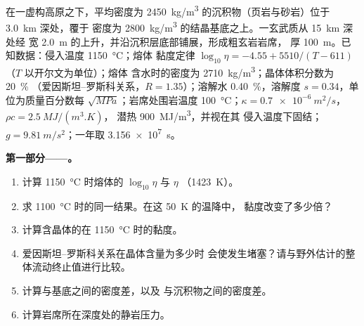 \begin{problem}
\label{pb:b2:magma-emplacement:1}
在一虚构高原之下，平均密度为
\qty{2450}{kg/m^3} 的沉积物（页岩与砂岩）位于 \qty{3.0}{km} 深处，覆于
密度为 \qty{2800}{kg/m^3} 的结晶基底之上。一玄武质从 \qty{15}{km} 深处经
宽 \qty{2.0}{m} 的上升，并沿沉积层底部铺展，形成粗玄岩岩席，
厚 \qty{100}{m}。已知数据：侵入温度 \qty{1150}{\celsius}；熔体
黏度定律 $\log_{10}\eta = -4.55 + 5510/(T - 611)$（$T$ 以开尔文为单位）；熔体
含水时的密度为 \qty{2710}{kg/m^3}；晶体体积分数为 \qty{20}{\percent}
（爱因斯坦–罗斯科关系，$R = 1.35$）；溶解水 \qty{0.40}{\percent}，溶解度
$s = 0.34$，单位为质量百分数每 $\sqrt{\unit{MPa}}$；岩席处围岩温度
\qty{100}{\celsius}；$\kappa = \qty{0.7e-6}{m^2/s}$，$\rho c = \qty{2.5}{MJ/(m^3.K)}$，
潜热 \qty{900}{MJ/m^3}，并视在其
侵入温度下固结；$g = \qty{9.81}{m/s^2}$；一年取 \qty{3.156e7}{s}。

\medskip\noindent\textbf{第一部分——。}
\begin{enumerate}
\item 计算 \qty{1150}{\celsius} 时熔体的 $\log_{10}\eta$ 与 $\eta$
（\qty{1423}{K}）。
\item 求 \qty{1100}{\celsius} 时的同一结果。在这 \qty{50}{K} 的温降中，
黏度改变了多少倍？
\item 计算含晶体的在
\qty{1150}{\celsius} 时的黏度。
\item 爱因斯坦–罗斯科关系在晶体含量为多少时
会使发生堵塞？请与野外估计的整体流动终止值进行比较。
\item 计算与基底之间的密度差，以及
与沉积物之间的密度差。
\item 计算岩席所在深度处的静岩压力。
\end{enumerate}


\end{problem}

